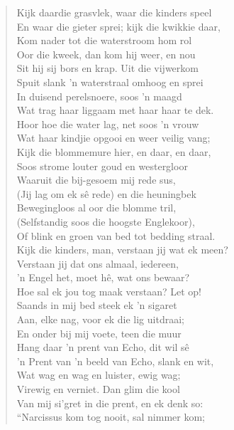 \begin{verse}
Kijk daardie grasvlek, waar die kinders speel \\ 
En waar die gieter sprei; kijk die kwikkie daar, \\ 
Kom nader tot die waterstroom hom rol \\ 
Oor die kweek, dan kom hij weer, en nou \\ 
Sit hij sij bors en krap. Uit die vijwerkom \\ 
Spuit slank ’n waterstraal omhoog en sprei \\ 
In duisend perelsnoere, soos ’n maagd \\ 
Wat trag haar liggaam met haar haar te dek. \\ 
Hoor hoe die water lag, net soos ’n vrouw \\ 
Wat haar kindjie opgooi en weer veilig vang; \\ 
Kijk die blommemure hier, en daar, en daar, \\ 
Soos strome louter goud en westergloor \\ 
Waaruit die bij-gesoem mij rede sus, \\ 
(Jij lag om ek sê rede) en die heuningbek \\ 
Bewegingloos al oor die blomme tril, \\ 
(Selfstandig soos die hoogste Englekoor), \\ 
Of blink en groen van bed tot bedding straal. \\ 
Kijk die kinders, man, verstaan jij wat ek meen? \\ 
Verstaan jij dat ons almaal, iedereen, \\ 
’n Engel het, moet hê, wat ons bewaar? \\ 
Hoe sal ek jou tog maak verstaan? Let op! \\ 
Saands in mij bed steek ek ’n sigaret \\ 
Aan, elke nag, voor ek die lig uitdraai; \\ 
En onder bij mij voete, teen die muur \\ 
Hang daar ’n prent van Echo, dit wil sê \\ 
’n Prent van ’n beeld van Echo, slank en wit, \\ 
Wat wag en wag en luister, ewig wag; \\ 
Virewig en verniet. Dan glim die kool \\ 
Van mij si’gret in die prent, en ek denk so: \\ 
``Narcissus kom tog nooit, sal nimmer kom; \\ 

\end{verse}

